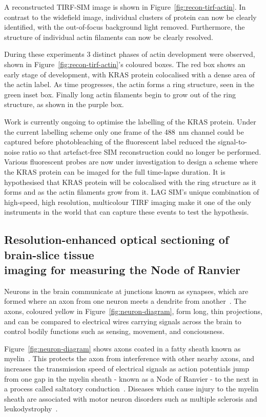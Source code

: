 A reconstructed TIRF-SIM image is shown in Figure~\ref{fig:recon-tirf-actin}.
In contrast to the widefield image, individual clusters of protein can now be clearly identified, with the out-of-focus background light removed.
Furthermore, the structure of individual actin filaments can now be clearly resolved.

During these experiments 3 distinct phases of actin development were observed, shown in Figure~\ref{fig:recon-tirf-actin}'s coloured boxes.
The red box shows an early stage of development, with KRAS protein colocalised with a dense area of the actin label.
As time progresses, the actin forms a ring structure, seen in the green inset box.
Finally long actin filaments begin to grow out of the ring structure, as shown in the purple box.

Work is currently ongoing to optimise the labelling of the KRAS protein.
Under the current labelling scheme only one frame of the \SI{488}{\nano\metre} channel could be captured before photobleaching of the fluorescent label reduced the signal-to-noise ratio so that artefact-free SIM reconstruction could no longer be performed.
Various fluorescent probes are now under investigation to design a scheme where the KRAS protein can be imaged for the full time-lapse duration.
It is hypothesised that KRAS protein will be colocalised with the ring structure as it forms and as the actin filaments grow from it.
LAG SIM's unique combination of high-speed, high resolution, multicolour TIRF imaging make it one of the only instruments in the world that can capture these events to test the hypothesis.


\subsection[Resolution-enhanced optical sectioning of brain-slice tissue imaging for measuring the Node of Ranvier]{Resolution-enhanced optical sectioning of brain-slice tissue\\ imaging for measuring the Node of Ranvier}
Neurons in the brain communicate at junctions known as synapses, which are formed where an axon from one neuron meets a dendrite from another~\cite{hall1992introduction}.
The axons, coloured yellow in Figure~\ref{fig:neuron-diagram}, form long, thin projections, and can be compared to electrical wires carrying signals across the brain to control bodily functions such as sensing, movement, and conciousness.

Figure~\ref{fig:neuron-diagram} shows axons coated in a fatty sheath known as myelin~\cite{hall1992introduction}.
This protects the axon from interference with other nearby axons, and increases the transmission speed of electrical signals as action potentials jump from one gap in the myelin sheath - known as a Node of Ranvier - to the next in a process called saltatory conduction~\cite{tasaki1939electro}.
Diseases which cause injury to the myelin sheath are associated with motor neuron disorders such as multiple sclerosis and leukodystrophy~\cite{suzuki2001demyelinating}.

